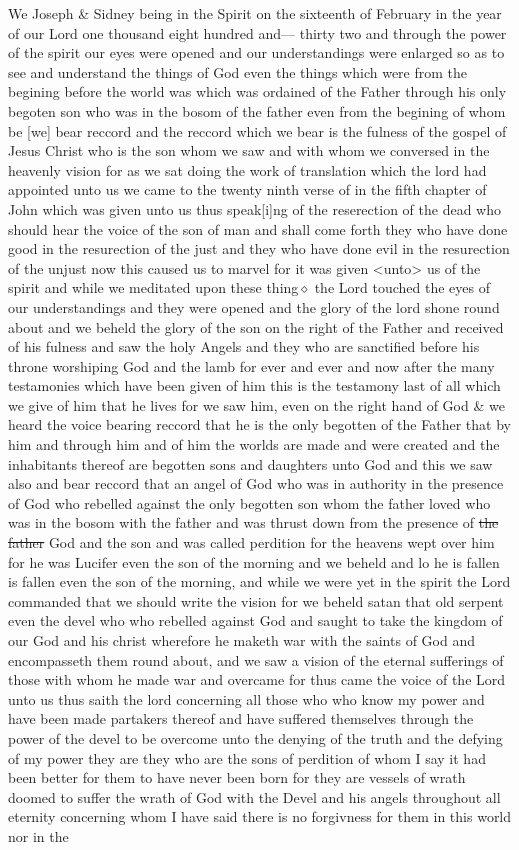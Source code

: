 				We Joseph \& Sidney being in the Spirit on the sixteenth of February in the year of our Lord one thousand eight hundred and--- thirty two and through the power of the spirit our eyes were opened and our understandings were enlarged so as to see and understand the things of God even the things which were from the begining before the world was which was ordained of the Father through his only begoten son who was in the bosom of the father even from the begining of whom be [we] bear reccord and the reccord which we bear is the fulness of the gospel of Jesus Christ who is the son whom we saw and with whom we conversed in the heavenly vision for as we sat doing the work of translation which the lord had appointed unto us we came to the twenty ninth verse of in the fifth chapter of John which was given unto us thus speak[i]ng of the reserection of the dead who should hear the voice of the son of man and shall come forth they who have done good in the resurection of the just and they who have done evil in the resurection of the unjust now this caused us to marvel for it was given <unto> us of the spirit and while we meditated upon these thing$\diamond$ the Lord touched the eyes of our understandings and they were opened and the glory of the lord shone round about and we beheld the glory of the son on the right of the Father and received of his fulness and saw the holy Angels and they who are sanctified before his throne worshiping God and the lamb for ever and ever and now after the many testamonies which have been given of him this is the testamony last of all which we give of him that he lives for we saw him, even on the right hand of God \& we heard the voice bearing reccord that he is the only begotten of the Father that by him and through him and of him the worlds are made and were created and the inhabitants thereof are begotten sons and daughters unto God and this we saw also and bear reccord that an angel of God who was in authority in the presence of God who rebelled against the only begotten son whom the father loved who was in the bosom with the father and was thrust down from the presence of \sout{the father} God and the son and was called perdition for the heavens wept over him for he was Lucifer even the son of the morning and we beheld and lo he is fallen is fallen even the son of the morning, and while we were yet in the spirit the Lord commanded that we should write the vision for we beheld satan that old serpent even the devel who who rebelled against God and saught to take the kingdom of our God and his christ wherefore he maketh war with the saints of God and encompasseth them round about, and we saw a vision of the eternal sufferings of those with whom he made war and overcame for thus came the voice of the Lord unto us thus saith the lord concerning all those who who know my power and have been made partakers thereof and have suffered themselves through the power of the devel to be overcome unto the denying of the truth and the defying of my power they are they who are the sons of perdition of whom I say it had been better for them to have never been born for they are vessels of wrath doomed to suffer the wrath of God with the Devel and his angels throughout all eternity concerning whom I have said there is no forgivness for them in this world nor in the 